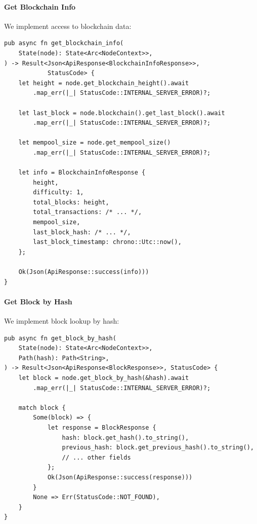 \paragraph{Get Blockchain Info}

We implement access to blockchain data:

\begin{listing}[htbp]
\caption{Get blockchain info handler}
\label{lst:handler-blockchain-info}
\begin{verbatim}
pub async fn get_blockchain_info(
    State(node): State<Arc<NodeContext>>,
) -> Result<Json<ApiResponse<BlockchainInfoResponse>>,
            StatusCode> {
    let height = node.get_blockchain_height().await
        .map_err(|_| StatusCode::INTERNAL_SERVER_ERROR)?;

    let last_block = node.blockchain().get_last_block().await
        .map_err(|_| StatusCode::INTERNAL_SERVER_ERROR)?;

    let mempool_size = node.get_mempool_size()
        .map_err(|_| StatusCode::INTERNAL_SERVER_ERROR)?;

    let info = BlockchainInfoResponse {
        height,
        difficulty: 1,
        total_blocks: height,
        total_transactions: /* ... */,
        mempool_size,
        last_block_hash: /* ... */,
        last_block_timestamp: chrono::Utc::now(),
    };

    Ok(Json(ApiResponse::success(info)))
}
\end{verbatim}
\end{listing}

\paragraph{Get Block by Hash}

We implement block lookup by hash:

\begin{listing}[htbp]
\caption{Get block by hash handler with path extraction}
\label{lst:handler-block-by-hash}
\begin{verbatim}
pub async fn get_block_by_hash(
    State(node): State<Arc<NodeContext>>,
    Path(hash): Path<String>,
) -> Result<Json<ApiResponse<BlockResponse>>, StatusCode> {
    let block = node.get_block_by_hash(&hash).await
        .map_err(|_| StatusCode::INTERNAL_SERVER_ERROR)?;

    match block {
        Some(block) => {
            let response = BlockResponse {
                hash: block.get_hash().to_string(),
                previous_hash: block.get_previous_hash().to_string(),
                // ... other fields
            };
            Ok(Json(ApiResponse::success(response)))
        }
        None => Err(StatusCode::NOT_FOUND),
    }
}
\end{verbatim}
\end{listing}

